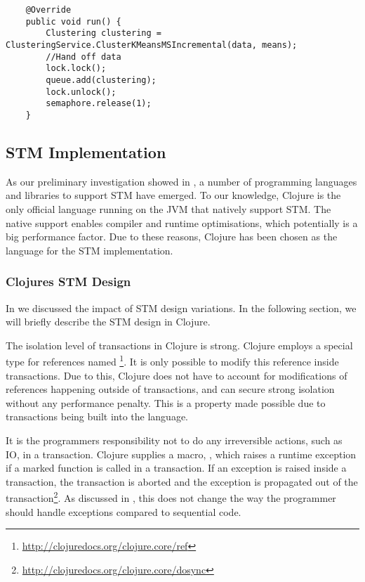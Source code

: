 {\begin{lstlisting}
    @Override
    public void run() {
        Clustering clustering = ClusteringService.ClusterKMeansMSIncremental(data, means);
        //Hand off data
        lock.lock();
        queue.add(clustering);
        lock.unlock();
        semaphore.release(1);
    }  
\end{lstlisting}

\subsection{\ac{STM} Implementation}
As our preliminary investigation showed in , a number of programming languages and libraries to support \ac{STM} have emerged. To our knowledge, Clojure is the only official language running on the \ac{JVM} that natively support \ac{STM}. The native support enables compiler and runtime optimisations, which potentially is a big performance factor. Due to these reasons, Clojure has been chosen as the language for the \ac{STM} implementation.


\subsubsection{Clojures \acs{STM} Design}
In  we discussed the impact of \ac{STM} design variations. In the following section, we will briefly describe the \ac{STM} design in Clojure.

The isolation level of transactions in Clojure is strong. Clojure employs a special type for references named \footnote{\url{http://clojuredocs.org/clojure.core/ref}}. It is only possible to modify this reference  inside transactions. Due to this, Clojure does not have to account for modifications of references happening outside of transactions, and can secure strong isolation without any performance penalty. This is a property made possible due to transactions being built into the language. 

It is the programmers responsibility not to do any irreversible actions, such as \ac{IO}, in a transaction. Clojure supplies a macro, , which raises a runtime exception if a marked function is called in a transaction. If an exception is raised inside a transaction, the transaction is aborted and the exception is propagated out of the transaction\footnote{\url{http://clojuredocs.org/clojure.core/dosync}}. As discussed in , this does not change the way the programmer should handle exceptions compared to sequential code. 

}
